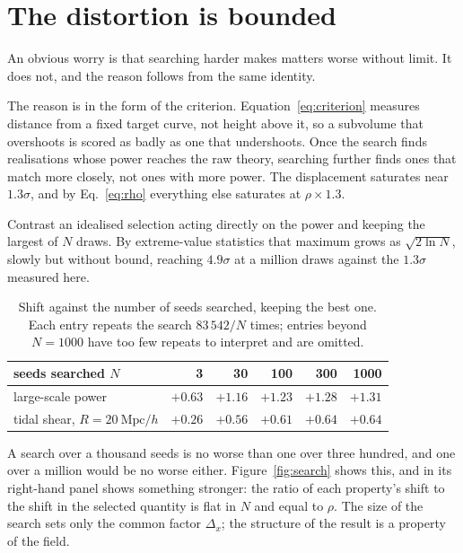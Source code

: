 \documentclass[12pt]{article}
\newcommand{\Mpch}{\ \mathrm{Mpc}/h}
\begin{document}
\section{The distortion is bounded}
\label{sec:bounded}

An obvious worry is that searching harder makes matters worse without limit. It
does not, and the reason follows from the same identity.

The reason is in the form of the criterion. Equation~\eqref{eq:criterion}
measures distance from a fixed target curve, not height above it, so a subvolume
that overshoots is scored as badly as one that undershoots. Once the search
finds realisations whose power reaches the raw theory, searching further finds
ones that match more closely, not ones with more power. The displacement
saturates near $1.3\sigma$, and by Eq.~\eqref{eq:rho} everything else saturates
at $\rho \times 1.3$.

Contrast an idealised selection acting directly on the power and keeping the
largest of $N$ draws. By extreme-value statistics that maximum grows as
$\sqrt{2\ln N}$, slowly but without bound, reaching $4.9\sigma$ at a million
draws against the $1.3\sigma$ measured here.

\begin{table}[htbp]
  \centering
  \caption{Shift against the number of seeds searched, keeping the best one.
  Each entry repeats the search $83\,542/N$ times; entries beyond $N = 1000$
  have too few repeats to interpret and are omitted.}
  \label{tab:saturation}
  \begin{tabular}{lrrrrr}
    \toprule
    seeds searched $N$ & 3 & 30 & 100 & 300 & 1000 \\
    \midrule
    large-scale power        & $+0.63$ & $+1.16$ & $+1.23$ & $+1.28$ & $+1.31$ \\
    tidal shear, $R = 20\Mpch$ & $+0.26$ & $+0.56$ & $+0.61$ & $+0.64$ & $+0.64$ \\
    \bottomrule
  \end{tabular}
\end{table}

A search over a thousand seeds is no worse than one over three hundred, and one
over a million would be no worse either. Figure~\ref{fig:search} shows this, and
in its right-hand panel shows something stronger: the ratio of each property's
shift to the shift in the selected quantity is flat in $N$ and equal to $\rho$.
The size of the search sets only the common factor $\Delta_x$; the structure of
the result is a property of the field.
\end{document}
